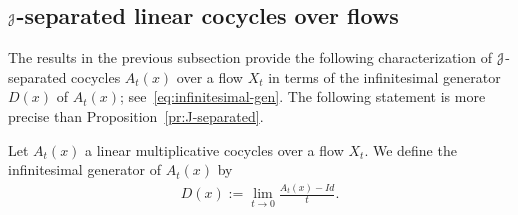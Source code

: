 \documentclass[12pt,reqno]{amsart}
\numberwithin{equation}{section}
\theoremstyle{plain}
\theoremstyle{definition}
\newcommand{\J}{\EuScript{J}}
\begin{document}

\subsection{$\J$-separated linear cocycles over flows}
\label{sec:j-separat-linear-1}

The results in the previous subsection provide the following
characterization of $\J$-separated cocycles $A_t(x)$ over a
flow $X_t$ in terms of the infinitesimal generator $D(x)$ of
$A_t(x)$; see~\eqref{eq:infinitesimal-gen}. The following
statement is more precise than
Proposition~\ref{pr:J-separated}.


Let $A_t(x)$ a linear multiplicative cocycles over a flow $X_t$. We define
the infinitesimal generator of $A_t(x)$ by
\begin{align}\label{eq:infinitesimal-gen}
  D(x):=\lim_{t\to0}\frac{A_t(x)-Id}t.
\end{align}
\end{document}
